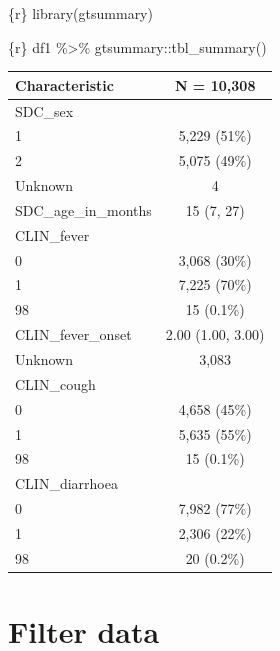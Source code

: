 \documentclass[
  letterpaper,
  DIV=11,
  numbers=noendperiod,
  oneside]{scrreprt}
\newenvironment{Shaded}{\begin{snugshade}}{\end{snugshade}}
\newcommand{\FunctionTok}[1]{\textcolor[rgb]{0.28,0.35,0.67}{#1}}
\newcommand{\InformationTok}[1]{\textcolor[rgb]{0.37,0.37,0.37}{#1}}
\newcommand{\NormalTok}[1]{\textcolor[rgb]{0.00,0.23,0.31}{#1}}
\newcommand{\SpecialCharTok}[1]{\textcolor[rgb]{0.37,0.37,0.37}{#1}}
\begin{document}
\begin{Shaded}
\begin{Highlighting}[]
\InformationTok{\textasciigrave{}\textasciigrave{}\textasciigrave{}\{r\}}
\FunctionTok{library}\NormalTok{(gtsummary)}
\InformationTok{\textasciigrave{}\textasciigrave{}\textasciigrave{}}
\end{Highlighting}
\end{Shaded}

\begin{Shaded}
\begin{Highlighting}[]
\InformationTok{\textasciigrave{}\textasciigrave{}\textasciigrave{}\{r\}}
\NormalTok{df1 }\SpecialCharTok{\%\textgreater{}\%} 
\NormalTok{  gtsummary}\SpecialCharTok{::}\FunctionTok{tbl\_summary}\NormalTok{()}
\InformationTok{\textasciigrave{}\textasciigrave{}\textasciigrave{}}
\end{Highlighting}
\end{Shaded}

\begin{longtable}[]{@{}lc@{}}
\toprule()
\textbf{Characteristic} & \textbf{N = 10,308} \\
\midrule()
\endhead
SDC\_sex & \\
1 & 5,229 (51\%) \\
2 & 5,075 (49\%) \\
Unknown & 4 \\
SDC\_age\_in\_months & 15 (7, 27) \\
CLIN\_fever & \\
0 & 3,068 (30\%) \\
1 & 7,225 (70\%) \\
98 & 15 (0.1\%) \\
CLIN\_fever\_onset & 2.00 (1.00, 3.00) \\
Unknown & 3,083 \\
CLIN\_cough & \\
0 & 4,658 (45\%) \\
1 & 5,635 (55\%) \\
98 & 15 (0.1\%) \\
CLIN\_diarrhoea & \\
0 & 7,982 (77\%) \\
1 & 2,306 (22\%) \\
98 & 20 (0.2\%) \\
\bottomrule()
\end{longtable}

\hypertarget{filter-data}{%
\section{Filter data}\label{filter-data}}
\end{document}
